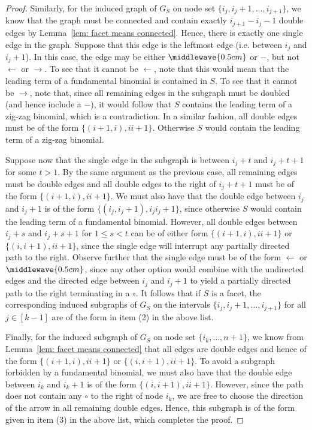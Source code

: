 \begin{proof}
Similarly, for the induced graph of $G_S$ on node set $\{i_j, i_j+1,\ldots, i_{j+1}\}$, we know that the graph must be connected and contain exactly $i_{j+1} - i_j -1$ double edges by Lemma~\ref{lem: facet means connected}. 
Hence, there is exactly one single edge in the graph. 
Suppose that this edge is the leftmost edge (i.e. between $i_j$ and $i_{j}+1$). 
In this case, the edge may be either $\middlewave{0.5cm}$ or $-$, but not $\leftarrow$ or $\rightarrow$.
To see that it cannot be $\leftarrow$, note that this would mean that the leading term of a fundamental binomial is contained in $S$.  
To see that it cannot be $\rightarrow$, note that, since all remaining edges in the subgraph must be doubled (and hence include a $-$), it would follow that $S$ contains the leading term of a zig-zag binomial, which is a contradiction. 
In a similar fashion, all double edges must be of the form $\{(i+1,i), ii+1\}$.
Otherwise $S$ would contain the leading term of a zig-zag binomial. 

Suppose now that the single edge in the subgraph is between $i_j+t$ and $i_j+{t+1}$ for some $t>1$.  
By the same argument as the previous case, all remaining edges must be double edges and all double edges to the right of $i_j+{t+1}$ must be of the form $\{(i+1,i), ii+1\}$. 
We must also have that the double edge between $i_j$ and $i_j+1$ is of the form $\{(i_j,i_j+1), i_ji_j+1\}$,
since otherwise $S$ would contain the leading term of a fundamental binomial. 
However, all double edges between $i_j+s$ and $i_j+s+1$ for $1\leq s< t$ can be of either form $\{(i+1,i), ii+1\}$ or $\{(i,i+1), ii+1\}$,
since the single edge will interrupt any partially directed path to the right. 
Observe further that the single edge must be of the form $\leftarrow$ or $\middlewave{0.5cm}$, since any other option would combine with the undirected edges and the directed edge between $i_j$ and $i_{j}+1$ to yield a partially directed path to the right terminating in a $\circ$. 
It follows that if $S$ is a facet, the corresponding induced subgraphs of $G_S$ on the intervals $\{i_j,i_j+1,\ldots, i_{j+1}\}$ for all $j\in[k-1]$ are of the form in item (2) in the above list. 

Finally, for the induced subgraph of $G_S$ on node set $\{i_k,\ldots, n+1\}$, we know from Lemma~\ref{lem: facet means connected} that all edges are double edges and hence of the form $\{(i+1,i), ii+1\}$ or $\{(i,i+1), ii+1\}$.  
To avoid a subgraph forbidden by a fundamental binomial, we must also have that the double edge between $i_k$ and $i_k+1$ is of the form $\{(i,i+1), ii+1\}$.  
However, since the path does not contain any $\circ$ to the right of node $i_k$, we are free to choose the direction of the arrow in all remaining double edges.  
Hence, this subgraph is of the form given in item (3) in the above list, which completes the proof.
\end{proof}

